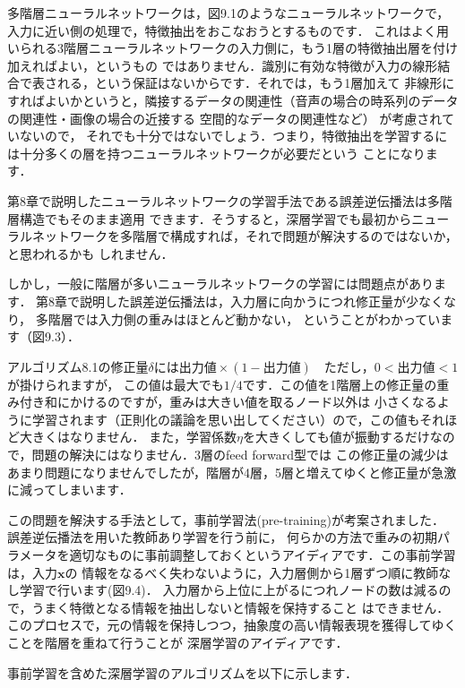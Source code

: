 多階層ニューラルネットワークは，図9.1のようなニューラルネットワークで，入力に近い側の処理で，特徴抽出をおこなおうとするものです．
これはよく用いられる3階層ニューラルネットワークの入力側に，もう1層の特徴抽出層を付け加えればよい，というもの
ではありません．識別に有効な特徴が入力の線形結合で表される，という保証はないからです．それでは，もう1層加えて
非線形にすればよいかというと，隣接するデータの関連性（音声の場合の時系列のデータの関連性・画像の場合の近接する
空間的なデータの関連性など）
が考慮されていないので，
それでも十分ではないでしょう．つまり，特徴抽出を学習するには十分多くの層を持つニューラルネットワークが必要だという
ことになります．

第8章で説明したニューラルネットワークの学習手法である誤差逆伝播法は多階層構造でもそのまま適用
できます．そうすると，深層学習でも最初からニューラルネットワークを多階層で構成すれば，それで問題が解決するのではないか，と思われるかも
しれません．

しかし，一般に階層が多いニューラルネットワークの学習には問題点があります．
第8章で説明した誤差逆伝播法は，入力層に向かうにつれ修正量が少なくなり，
多階層では入力側の重みはほとんど動かない，
ということがわかっています（図9.3）．

アルゴリズム8.1の修正量$\delta$には$出力値 \times (1-出力値) \quad ただし，0<出力値<1$が掛けられますが，
この値は最大でも$1/4$です．この値を1階層上の修正量の重み付き和にかけるのですが，重みは大きい値を取るノード以外は
小さくなるように学習されます（正則化の議論を思い出してください）ので，この値もそれほど大きくはなりません．
また，学習係数$\eta$を大きくしても値が振動するだけなので，問題の解決にはなりません．3層のfeed forward型では
この修正量の減少はあまり問題になりませんでしたが，階層が4層，5層と増えてゆくと修正量が急激に減ってしまいます．


この問題を解決する手法として，事前学習法(pre-training)が考案されました．
誤差逆伝播法を用いた教師あり学習を行う前に，
何らかの方法で重みの初期パラメータを適切なものに事前調整しておくというアイディアです．この事前学習は，入力$\bm{x}$の
情報をなるべく失わないように，入力層側から1層ずつ順に教師なし学習で行います(図9.4)．
入力層から上位に上がるにつれノードの数は減るので，うまく特徴となる情報を抽出しないと情報を保持すること
はできません．このプロセスで，元の情報を保持しつつ，抽象度の高い情報表現を獲得してゆくことを階層を重ねて行うことが
深層学習のアイディアです．


事前学習を含めた深層学習のアルゴリズムを以下に示します．

